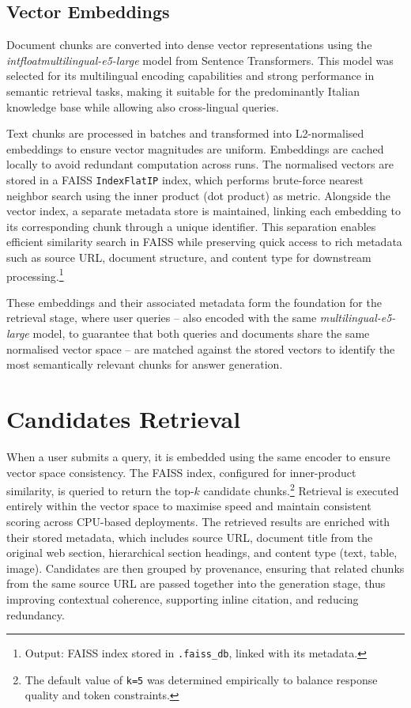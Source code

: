 \begin{spacing}{1.5}
\sloppy
\subsection{Vector Embeddings}
Document chunks are converted into dense vector representations using the \textit{intfloat\/multilingual-e5-large} model from Sentence Transformers. This model was selected for its multilingual encoding capabilities and strong performance in semantic retrieval tasks, making it suitable for the predominantly Italian knowledge base while allowing also cross-lingual queries. 

Text chunks are processed in batches and transformed into L2-normalised embeddings to ensure vector magnitudes are uniform. Embeddings are cached locally to avoid redundant computation across runs. The normalised vectors are stored in a FAISS \texttt{IndexFlatIP} index, which performs brute-force nearest neighbor search using the inner product (dot product) as metric. Alongside the vector index, a separate metadata store is maintained, linking each embedding to its corresponding chunk through a unique identifier. This separation enables efficient similarity search in FAISS while preserving quick access to rich metadata such as source URL, document structure, and content type for downstream processing.\footnote{Output: FAISS index stored in \texttt{.faiss\_db}, linked with its metadata.}

These embeddings and their associated metadata form the foundation for the retrieval stage, where user queries -- also encoded with the same \textit{multilingual-e5-large} model, to guarantee that both queries and documents share the same normalised vector space -- are matched against the stored vectors to identify the most semantically relevant chunks for answer generation.

\section{Candidates Retrieval}
When a user submits a query, it is embedded using the same encoder to ensure vector space consistency. The FAISS index, configured for inner-product similarity, is queried to return the top-$k$ candidate chunks.\footnote{The default value of \texttt{k=5} was determined empirically to balance response quality and token constraints.} Retrieval is executed entirely within the vector space to maximise speed and maintain consistent scoring across CPU-based deployments. The retrieved results are enriched with their stored metadata, which includes source URL, document title from the original web section, hierarchical section headings, and content type (text, table, image). Candidates are then grouped by provenance, ensuring that related chunks from the same source URL are passed together into the generation stage, thus improving contextual coherence, supporting inline citation, and reducing redundancy.


\end{spacing}
